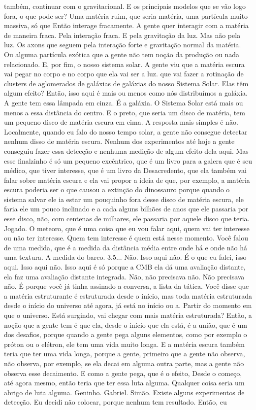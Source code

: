 \documentclass[
	article,			%
	11pt,				%
	twoside,			%
	a4paper,			%
	english,			%
	brazil,				%
	sumario=tradicional
	]{abntex2}
\begin{document}
também, continuar com o gravitacional. E os principais modelos que se vão logo fora, o que pode ser? Uma matéria ruim, que seria matéria, uma partícula muito massiva, só que Então interage fracamente. A gente quer interagir com a matéria de maneira fraca. Pela interação fraca. E pela gravitação da luz. Mas não pela luz. Os axons que seguem pela interação forte e gravitação normal da matéria. Ou alguma partícula exótica que a gente não tem noção da produção ou nada relacionado. E, por fim, o nosso sistema solar. A gente viu que a matéria escura vai pegar no corpo e no corpo que ela vai ser a luz. que vai fazer a rotinação de clusters de aglomerados de galáxias de galáxias do nosso Sistema Solar. Elas têm algum efeito? Então, isso aqui é mais ou menos como nós distribuímos a galáxia. A gente tem essa lâmpada em cinza. É a galáxia. O Sistema Solar está mais ou menos a essa distância do centro. E o preto, que seria um disco de matéria, tem um pequeno disco de matéria escura em cima. A resposta mais simples é não. Localmente, quando eu falo do nosso tempo solar, a gente não consegue detectar nenhum disso de matéria escura. Nenhum dos experimentos até hoje a gente conseguiu fazer essa detecção e nenhuma medição de algum efeito dela aqui. Mas esse finalzinho é só um pequeno excêntrico, que é um livro para a galera que é seu médico, que tiver interesse, que é um livro da Desacredento, que ela também vai falar sobre matéria escura e ela vai propor a ideia de que, por exemplo, a matéria escura poderia ser o que causou a extinção do dinossauro porque quando o sistema salvar ele ia estar um pouquinho fora desse disco de matéria escura, ele faria ele um pouco inclinado e a cada alguns bilhões de anos que ele passaria por esse disco, não, com centenas de milhares, ele passaria por aquele disco que teria. Jogado. O meteoro, que é uma coisa que eu vou falar aqui, quem vai ter interesse ou não ter interesse. Quem tem interesse é quem está nesse momento. Você falou de uma medida, que é a medida da distância média entre onde há e onde não há uma textura. A medida do barco. 3.5... Não. Isso aqui não. É o que eu falei, isso aqui. Isso aqui não. Isso aqui é só porque a CMB ela dá uma avaliação distante, ela faz uma avaliação distante integrada. Não, não precisava não. Não precisava não. É porque você já tinha assinado a conversa, a lista da tática. Você disse que a matéria estruturante é estruturada desde o início, mas toda matéria estruturada desde o início do universo até agora, já está no início ou a. Partir do momento em que o universo. Está surgindo, vai chegar com mais matéria estruturada? Então, a noção que a gente tem é que ela, desde o início que ela está, é a união, que é um dos desafios, porque quando a gente pega alguns elementos, como por exemplo o próton ou o elétron, ele tem uma vida muito longa. E a matéria escura também teria que ter uma vida longa, porque a gente, primeiro que a gente não observa, não observa, por exemplo, se ela decai em alguma outra parte, mas a gente não observa esse decaimento. E como a gente pega, que é o efeito, Desde o começo, até agora mesmo, então teria que ter essa luta alguma. Qualquer coisa seria um abrigo de luta alguma. Geninho. Gabriel. Simão. Existe alguns experimentos de detecção. Eu decidi não colocar, porque nenhum tem resultado. Então, eu 
\end{document}
